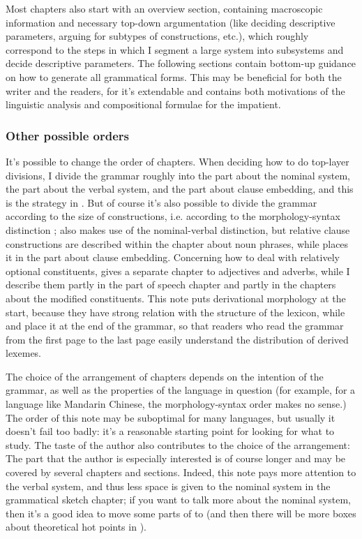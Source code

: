 \documentclass[UTF8, a4paper, oneside, scheme=plain]{ctexrep}
\begin{document}
Most chapters also start with an overview section,
containing macroscopic information and necessary top-down argumentation
(like deciding descriptive parameters,
arguing for subtypes of constructions, etc.),
which roughly correspond to the 
steps in which I segment a large system into subsystems 
and decide descriptive parameters.
The following sections contain bottom-up guidance 
on how to generate all grammatical forms.
This may be beneficial for both the writer and the readers,
for it's extendable
and contains both motivations of the linguistic analysis 
and compositional formulae for the impatient.

\subsubsection{Other possible orders}

It's possible to change the order of chapters.
When deciding how to do top-layer divisions,
I divide the grammar roughly into 
the part about the nominal system, 
the part about the verbal system,
and the part about clause embedding,
and this is the strategy in \citet{jacques2021grammar}.
But of course it's also possible to 
divide the grammar according to the size of constructions, 
i.e. according to the morphology-syntax distinction
\citep{greenough2013allen,forker2020grammar};
\citet{maurer2021grammar} also makes use of the nominal-verbal distinction,
but relative clause constructions are described within the chapter about noun phrases,
while \citet{jacques2021grammar} places it in the part about clause embedding.
Concerning how to deal with relatively optional constituents,
\citet{cgel} gives a separate chapter to adjectives and adverbs,
while I describe them partly in the part of speech chapter 
and partly in the chapters about the modified constituents.
This note puts derivational morphology at the start,
because they have strong relation with the structure of the lexicon,
while \citet{cgel} and \citet{maurer2021grammar} place it at the end of the grammar,
so that readers who read the grammar from the first page to the last page 
easily understand the distribution of derived lexemes.

The choice of the arrangement of chapters depends on the intention of the grammar,
as well as the properties of the language in question 
(for example, for a language like Mandarin Chinese, 
the morphology-syntax order makes no sense.)
The order of this note may be suboptimal for many languages,
but usually it doesn't fail too badly:
it's a reasonable starting point for looking for what to study.
The taste of the author also contributes to the choice of the arrangement:
The part that the author is especially interested is of course longer 
and may be covered by several chapters and sections.
Indeed, this note pays more attention to the verbal system,
and thus less space is given to the nominal system in the grammatical sketch chapter;
if you want to talk more about the nominal system,
then it's a good idea to move some parts of 
to 
(and then there will be more boxes about theoretical hot points 
in ).
\end{document}

